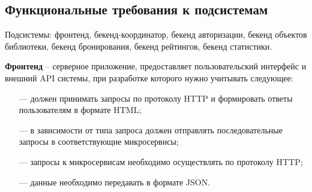\documentclass[a4paper, 12pt]{article}
\begin{document}
\begin{large}
\subsection{Функциональные требования к подсистемам}
Подсистемы: фронтенд, бекенд-координатор, бекенд авторизации, бекенд объектов библиотеки, бекенд бронирования, бекенд рейтингов, бекенд статистики.

\textbf{Фронтенд} -- серверное  приложение, предоставляет пользовательский интерфейс и внешний API системы, при разработке которого нужно учитывать следующее:
\begin{itemize}
	\item[---] должен принимать запросы по протоколу HTTP и формировать ответы пользователям в формате HTML;
	
	\item[---] в зависимости от типа запроса должен отправлять последовательные запросы в соответствующие микросервисы;
	
	\item[---] запросы к микросервисам необходимо осуществлять по протоколу HTTP;
	
	\item[---] данные необходимо передавать в формате JSON.
\end{itemize}


\end{large}
\end{document}
